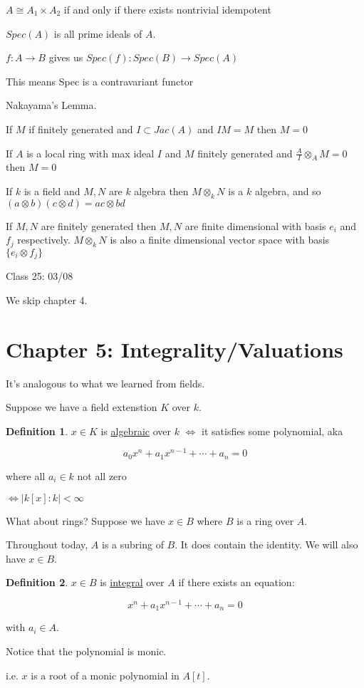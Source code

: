 \documentclass{article}
\theoremstyle{definition}
\newtheorem{definition}{Definition}
\begin{document}
\(A\cong A_1 \times A_2\) if and only if there exists nontrivial idempotent

\(Spec(A)\) is all prime ideals of \(A\).

\(f:A \to B\) gives us \(Spec(f):Spec(B) \to Spec(A)\)

This means Spec is a contravariant functor

Nakayama's Lemma.

If \(M\) if finitely generated and \(I \subset Jac(A)\) and \(IM=M\) then \(M = 0\) 

If \(A\) is a local ring with max ideal \(I\) and \(M\) finitely generated and \(\frac{A}{I} \otimes _A M = 0 \) then \(M = 0\) 

If \(k\) is a field and \(M,N\) are \(k\) algebra then \(M \otimes _k N\) is a \(k\) algebra, and so \((a \otimes b) (c \otimes d) = ac \otimes bd\) 

If \(M,N\) are finitely generated then \(M,N\) are finite dimensional with basis \(e_i\) and \(f_j\) respectively. \(M \otimes _k N\) is also a finite dimensional vector space with basis \(\{ e_i \otimes f_j \} \) 

\hrulefill

Class 25: 03/08

We skip chapter 4.

\section*{Chapter 5: Integrality/Valuations}

It's analogous to what we learned from fields.

Suppose we have a field extenstion \(K\) over \(k\).

\begin{definition}
    \(x\in K\) is \underline{algebraic} over \(k\) \(\iff \) it satisfies some polynomial, aka

    \[
        a_0 x^n + a_1 x^{n-1} + \cdots + a_n = 0 
    \]

    where all \(a_i\in k\) not all zero

    \(\iff \vert k[x] : k \vert < \infty\) 
\end{definition}

What about rings? Suppose we have \(x\in B\) where \(B\) is a ring over \(A\).

Throughout today, \(A\) is a subring of \(B\). It does contain the identity. We will also have \(x\in B\).

\begin{definition}
    \(x\in B\) is \underline{integral} over \(A\) if there exists an equation:

    \[
        x^n + a_1 x^{n-1} + \cdots + a_n = 0 
    \]

    with \(a_i\in A\).

    Notice that the polynomial is monic.

    i.e. \(x\) is a root of a monic polynomial in \(A[t]\).
\end{definition}
\end{document}
